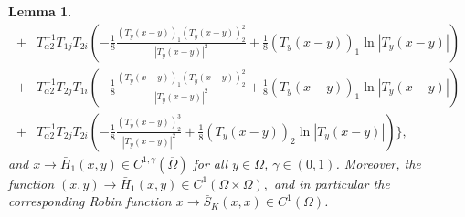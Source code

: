 \documentclass[12pt,reqno]{amsart}
\numberwithin{equation}{section}
\newtheorem{lemma}[theorem]{Lemma}
\theoremstyle{definition}
\theoremstyle{remark}
\begin{document}
\begin{lemma}
\begin{equation}
\begin{split}
+&T^{-1}_{\alpha2}T_{1j}T_{2i}\left( -\frac{1}{8}\frac{\left( T_y\left (x-y\right )\right) _1\left( T_y\left (x-y\right )\right) _2^2}{|T_y\left (x-y\right )|^2}+\frac{1}{8}\left( T_y\left (x-y\right )\right)_1\ln|T_y\left (x-y\right )|\right)\\
+&T^{-1}_{\alpha2}T_{2j}T_{1i}\left( -\frac{1}{8}\frac{\left( T_y\left (x-y\right )\right) _1\left( T_y\left (x-y\right )\right) _2^2}{|T_y\left (x-y\right )|^2}+\frac{1}{8}\left( T_y\left (x-y\right )\right)_1\ln|T_y\left (x-y\right )|\right)\\
+&T^{-1}_{\alpha2}T_{2j}T_{2i}\left( -\frac{1}{8}\frac{\left( T_y\left (x-y\right )\right) _2^3 }{|T_y\left (x-y\right )|^2}+\frac{1}{8}\left( T_y\left (x-y\right )\right)_2\ln|T_y\left (x-y\right )|\right)\bigg\},
\end{split}
\end{equation}
 and $ x\to \bar{H}_1(x,y)\in C^{1,\gamma}(\overline{\Omega})$ for all $ y\in \Omega $, $ \gamma\in (0, 1) $.  Moreover, the function $(x, y)\to \bar{H}_1(x,y)\in C^1(\Omega\times\Omega),$ and in particular the corresponding Robin function $x\to \bar{S}_K(x,x)\in C^1(\Omega)$.
\end{lemma}
\end{document}
